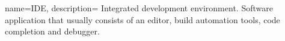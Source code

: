 
 {
    name=IDE,
    description={
        Integrated development environment. Software application that usually consists of an editor, build automation tools, code completion and debugger.
    }
}